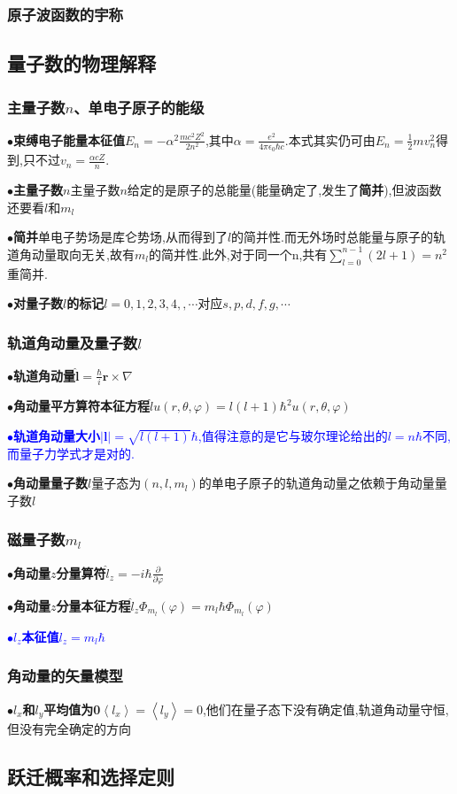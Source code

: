 \documentclass[UTF8]{article}
\newcommand{\keypoint}[2]{$\bullet$\textbf{#1}\quad#2\par}
\begin{document}
\subsubsection{原子波函数的宇称}
\subsection{量子数的物理解释}
\subsubsection{主量子数$n$、单电子原子的能级}
\keypoint{束缚电子能量本征值}{$E_{n}=-\alpha^{2}\frac{mc^{2}Z^{2}}{2n^{2}}$,其中$\alpha=\frac{e^{2}}{4\pi\epsilon_{0}\hbar c}$.本式其实仍可由$E_n=\frac{1}{2}mv_n^2$得到,只不过$v_n=\frac{\alpha cZ}{n}$.}
\keypoint{主量子数$n$}{主量子数$n$给定的是原子的总能量(能量确定了,发生了\textbf{简并}),但波函数还要看$l$和$m_{l}$}
\keypoint{简并}{单电子势场是库仑势场,从而得到了$l$的简并性.而无外场时总能量与原子的轨道角动量取向无关,故有$m_l$的简并性.此外,对于同一个n,共有$\sum\limits_{l=0}^{n-1}(2l+1)=n^2$重简并.}
\keypoint{对量子数$l$的标记}{$l=0,1,2,3,4,,\cdots\mbox{对应}s,p,d,f,g,\cdots$}
\subsubsection{轨道角动量及量子数$l$}
\keypoint{轨道角动量}{$\bm{\hat{l}}=\frac{\hbar}{i}\bm{r}\times\nabla$}
\keypoint{角动量平方算符本征方程}{$\hat{l}u(r,\theta,\varphi)=l(l+1)\hbar^{2}u(r,\theta,\varphi)$}
\textcolor{blue}{\keypoint{轨道角动量大小}{$\left|\bm{l}\right|=\sqrt{l(l+1)}\hbar$,值得注意的是它与玻尔理论给出的$l=n\hbar$不同,而量子力学式才是对的.}}
\keypoint{角动量量子数$l$}{量子态为$(n,l,m_{l})$的单电子原子的轨道角动量之依赖于角动量量子数$l$}
\subsubsection{磁量子数$m_{l}$}
\keypoint{角动量$z$分量算符}{$\hat{l}_{z}=-i\hbar\frac{\partial}{\partial \varphi}$}
\keypoint{角动量$z$分量本征方程}{$\hat{l}_{z}\Phi_{m_{l}}(\varphi)=m_{l}\hbar\Phi_{m_{l}}(\varphi)$}
\textcolor{blue}{\keypoint{$l_{z}$本征值}{$l_{z}=m_l\hbar$}}
\subsubsection{角动量的矢量模型}
\keypoint{$l_x$和$l_y$平均值为0}{$\left\langle l_x\right\rangle =\left\langle l_y\right\rangle =0 $,他们在量子态下没有确定值,轨道角动量守恒,但没有完全确定的方向}
\subsection{跃迁概率和选择定则}
\end{document}
